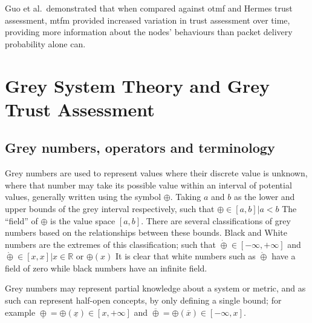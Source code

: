 Guo et al.\ demonstrated that when compared against \acrshort{otmf} and Hermes trust assessment, \acrshort{mtfm} provided increased variation in trust assessment over time, providing more information about the nodes' behaviours than packet delivery probability alone can.

\section{Grey System Theory and Grey Trust Assessment}
\subsection{Grey numbers, operators and terminology}
Grey numbers are used to represent values where their discrete value is unknown, where that number may take its possible value within an interval of potential values, generally written using the symbol $\oplus$.
Taking $a$ and $b$ as the lower and upper bounds of the grey interval respectively, such that $\oplus \in [a,b] | a < b$ 
The ``field'' of $\oplus$ is the value space $[a,b]$.
There are several classifications of grey numbers based on the relationships between these bounds.
Black and White numbers are the extremes of this classification; such that $\dot\oplus \in [-\infty, +\infty]$ and $\mathring\oplus \in [x, x] | x \in \mathbb{R}$ or $\oplus(x)$
It is clear that white numbers such as $\mathring\oplus$ have a field of zero while black numbers have an infinite field.

Grey numbers may represent partial knowledge about a system or metric, and as such can represent half-open concepts, by only defining a single bound; for example $\underline\oplus = \oplus(\underline x ) \in [x, +\infty]$ and $\overline\oplus = \oplus(\overline x) \in [-\infty, x]$.

